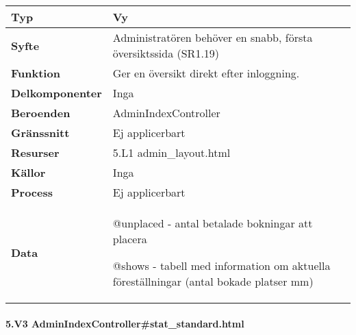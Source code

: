 \documentclass[a4paper, twoside, 11pt, titlepage]{article}
\begin{document}
			\begin {table} [ht] \begin{tabular} {  p{3.5cm} p{11.6cm} }
				\hline
				{\sffamily\textbf{Typ}} & {Vy} \\
				\hline
				{\sffamily\textbf{Syfte}} & {Administratören behöver en snabb, första översiktssida (SR1.19)} \\
				\hline
				{\sffamily\textbf{Funktion}} & {Ger en översikt direkt efter inloggning.} \\
				\hline
				{\sffamily\textbf{Delkomponenter}} & {Inga} \\
				\hline
				{\sffamily\textbf{Beroenden}} & {AdminIndexController} \\
				\hline
				{\sffamily\textbf{Gränssnitt}} & {Ej applicerbart} \\
				\hline
				{\sffamily\textbf{Resurser}} & {5.L1 admin\_layout.html} \\
				\hline
				{\sffamily\textbf{Källor}} & {Inga} \\
				\hline
				{\sffamily\textbf{Process}} & {Ej applicerbart} \\
				\hline
				{\sffamily\textbf{Data}} & {@unplaced - antal betalade bokningar att placera

@shows - tabell med information om aktuella föreställningar (antal bokade platser mm)} \\
				\hline
			\end{tabular} \end{table} \FloatBarrier


			\paragraph{5.V3 AdminIndexController\#stat\_standard.html}\
\end{document}
